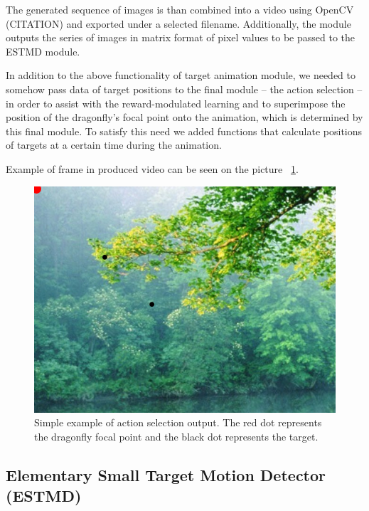 \documentclass[a4paper,11pt]{article}
\begin{document}
The generated sequence of images is than combined into a video using OpenCV (CITATION) and exported under a selected filename. Additionally, the module outputs the series of images in matrix format of pixel values to be passed to the ESTMD module.

In addition to the above functionality of target animation module, we needed to somehow pass data of target positions to the final module – the action selection – in order to assist with the reward-modulated learning and to superimpose the position of the dragonfly's focal point onto the animation, which is determined by this final module. To satisfy this need we added functions that calculate positions of targets at a certain time during the animation.

Example of frame in produced video can be seen on the picture  ~\ref{target_animation_example}.

\begin{figure}[hb]
\centering
\includegraphics[scale = 0.3]{example}
\caption{Simple example of action selection output. The red dot represents the dragonfly focal point and the black dot represents the target.}
\label{target_animation_example}
\end{figure}


\subsection{Elementary Small Target Motion Detector (ESTMD)}
\end{document}
